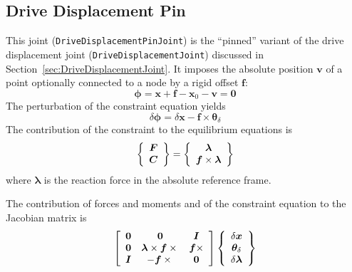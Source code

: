 \documentclass[10pt,dvips,fleqn,subeqn]{report}
\newcommand{\T}[1]{\bm{#1}}
\begin{document}
\subsection{Drive Displacement Pin}
\label{sec:DriveDisplacementPinJoint}
This joint (\texttt{DriveDisplacementPinJoint}) is the ``pinned'' variant 
of the drive displacement joint (\texttt{DriveDisplacementJoint}) discussed
in Section~\ref{sec:DriveDisplacementJoint}.
It imposes the absolute position $\T{v}$ of a point
optionally connected to a node by a rigid offset $\T{f}$:
\begin{equation}
	\T{\phi} = \T{x} + \T{f} - \T{x}_0 - \T{v} = \T{0}
\end{equation}
The perturbation of the constraint equation yields
\begin{equation}
	\delta\T{\phi} = 
	\delta\T{x} - \T{f}\times \T{\theta}_{\delta}
\end{equation}
The contribution of the constraint to the equilibrium equations is
\begin{equation}
	\cubr{\cvvect{
		\T{F} \\
		\T{C}
	}} = \cubr{\cvvect{
		\T{\lambda} \\
		\T{f}\times \T{\lambda}
	}}
\end{equation}
where $\T{\lambda}$ is the reaction force in the absolute reference frame.

The contribution of forces and moments and of the constraint equation 
to the Jacobian matrix is
\begin{equation}
	\sqbr{\matr{ccc}{
		\T{0} &
			\T{0} &
			\T{I} \\
		\T{0} &
			\T{\lambda}\times\T{f}\times{} &
			\T{f}\times \\
		\T{I} &
			- \T{f}\times{} &
			\T{0}
	}}\cubr{\cvvect{
		\delta\T{x} \\
		\T{\theta}_{\delta} \\
		\delta\T{\lambda}
	}}
\end{equation}
\end{document}
